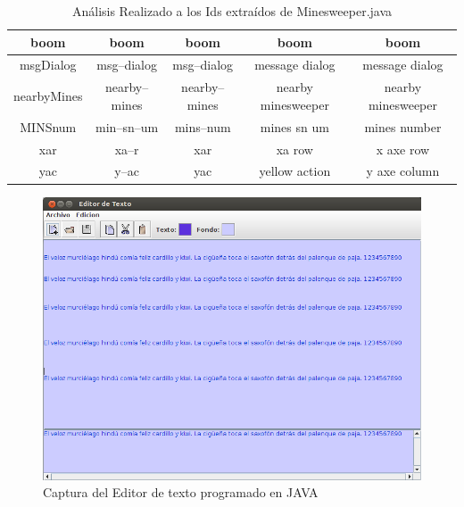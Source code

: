 \begin{table}
\begin{tabular}{| c | c | c | c | c |}
boom&boom&boom&boom&boom\\ \hline
msgDialog&msg--dialog&msg--dialog&message dialog&message dialog\\ \hline
nearbyMines&nearby--mines&nearby--mines&nearby minesweeper&nearby minesweeper\\ \hline
MINSnum&min--sn--um&mins--num&mines sn um&mines number\\ \hline
xar&xa--r&xar&xa row&x axe row\\ \hline
yac&y--ac&yac&yellow action&y axe column\\ \hline

  \end{tabular}
	 
   \caption{Análisis Realizado a los Ids extraídos de Minesweeper.java}
   \label{tabla5}
     
\end{table}

\clearpage %

\begin{figure}[t] %
\centerline{%
\includegraphics[scale= 0.64]{./cap4/caso_02.png}
}
\caption{Captura del Editor de texto programado en JAVA}
\label{caso2}
\end{figure}


